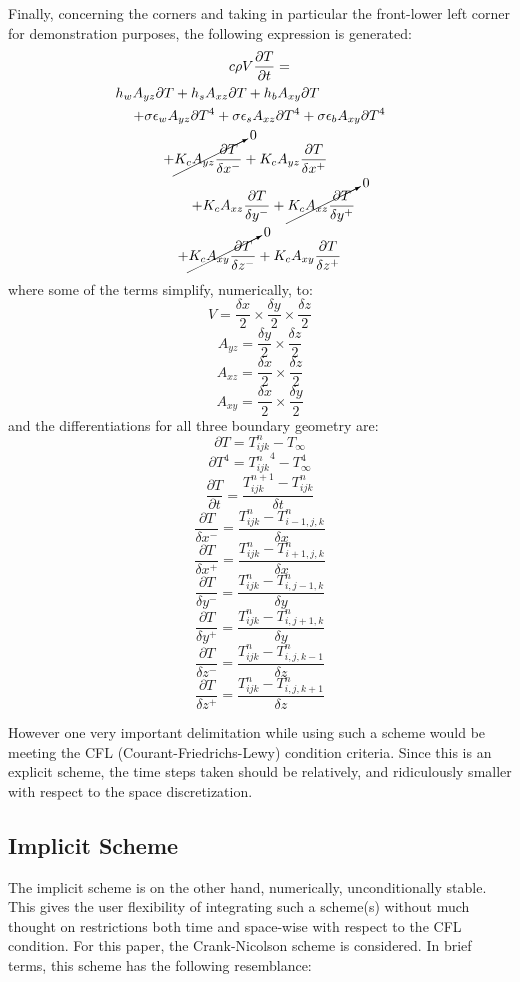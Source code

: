 \documentclass[a4paper,10pt]{IEEEtran}
\begin{document}
	Finally, concerning the corners and taking in particular the front-lower left corner for demonstration purposes, the following expression is generated:
	\begin{multline}
	c \rho V\frac{\partial T}{\partial t} = \\
	h_w A_{yz}\partial T + h_s A_{xz}\partial T + h_b A_{xy}\partial T \qquad \qquad \qquad\\
	+ \sigma \epsilon_w A_{yz}\partial T^4 + \sigma \epsilon_s A_{xz}\partial T^4 + \sigma \epsilon_b A_{xy}\partial T^4\\
	+ \cancelto{0}{K_c A_{yz}\frac{\partial T}{\delta x^-}} + K_c A_{yz}\frac{\partial T}{\delta x^+} \qquad\\
	\qquad + K_c A_{xz}\frac{\partial T}{\delta y^-} + \cancelto{0}{K_c A_{xz}\frac{\partial T}{\delta y^+}}\\
	+ \cancelto{0}{K_c A_{xy}\frac{\partial T}{\delta z^-}} + K_c A_{xy}\frac{\partial T}{\delta z^+}
	\end{multline}
	where some of the terms simplify, numerically, to:
	$$V = \frac{\delta x}{2} \times \frac{\delta y}{2} \times \frac{\delta z}{2} $$
	$$A_{yz} = \frac{\delta y}{2} \times \frac{\delta z}{2} $$
	$$A_{xz} = \frac{\delta x}{2} \times \frac{\delta z}{2} $$
	$$A_{xy} = \frac{\delta x}{2} \times \frac{\delta y}{2} $$
	and the differentiations for all three boundary geometry are:
	$$\partial T = T_{ijk}^n - T_\infty $$
	$$\partial T^4 = {T_{ijk}^n}^4 - T_\infty^4 $$
	$$\frac{\partial T}{\partial t} = \frac{T_{ijk}^{n+1} - T_{ijk}^n}{\delta t} $$
	$$\frac{\partial T}{\delta x^-} = \frac{T_{ijk}^n - T_{i-1,j,k}^n}{\delta x} $$
	$$\frac{\partial T}{\delta x^+} = \frac{T_{ijk}^n - T_{i+1,j,k}^n}{\delta x} $$
	$$\frac{\partial T}{\delta y^-} = \frac{T_{ijk}^n - T_{i,j-1,k}^n}{\delta y} $$
	$$\frac{\partial T}{\delta y^+} = \frac{T_{ijk}^n - T_{i,j+1,k}^n}{\delta y} $$
	$$\frac{\partial T}{\delta z^-} = \frac{T_{ijk}^n - T_{i,j,k-1}^n}{\delta z} $$
	$$\frac{\partial T}{\delta z^+} = \frac{T_{ijk}^n - T_{i,j,k+1}^n}{\delta z} $$

	
	However one very important delimitation while using such a scheme would be meeting the CFL (Courant-Friedrichs-Lewy) condition criteria. Since this is an explicit scheme, the time steps taken should be relatively, and ridiculously smaller with respect to the space discretization. 
	
	
	\subsection{Implicit Scheme} 
	The implicit scheme is on the other hand, numerically, unconditionally stable. This gives the user flexibility of integrating such a scheme(s) without much thought on restrictions both time and space-wise with respect to the CFL condition. For this paper, the Crank-Nicolson scheme is considered. In brief terms, this scheme has the following resemblance:
	
\end{document}
